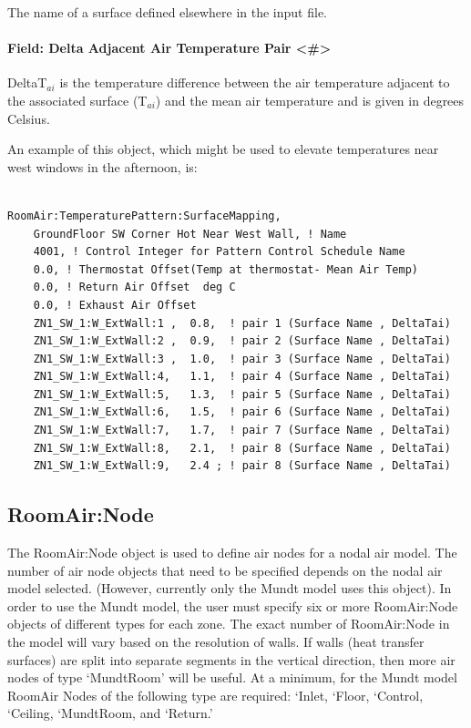 The name of a surface defined elsewhere in the input file.

\paragraph{Field: Delta Adjacent Air Temperature Pair \textless{}\#\textgreater{}}\label{field-delta-adjacent-air-temperature-pair}

DeltaT\(_{ai}\) is the temperature difference between the air temperature adjacent to the associated surface (T\(_{ai}\)) and the mean air temperature and is given in degrees Celsius.

An example of this object, which might be used to elevate temperatures near west windows in the afternoon, is:

\begin{lstlisting}

RoomAir:TemperaturePattern:SurfaceMapping,
    GroundFloor SW Corner Hot Near West Wall, ! Name
    4001, ! Control Integer for Pattern Control Schedule Name
    0.0, ! Thermostat Offset(Temp at thermostat- Mean Air Temp)
    0.0, ! Return Air Offset  deg C
    0.0, ! Exhaust Air Offset
    ZN1_SW_1:W_ExtWall:1 ,  0.8,  ! pair 1 (Surface Name , DeltaTai)
    ZN1_SW_1:W_ExtWall:2 ,  0.9,  ! pair 2 (Surface Name , DeltaTai)
    ZN1_SW_1:W_ExtWall:3 ,  1.0,  ! pair 3 (Surface Name , DeltaTai)
    ZN1_SW_1:W_ExtWall:4,   1.1,  ! pair 4 (Surface Name , DeltaTai)
    ZN1_SW_1:W_ExtWall:5,   1.3,  ! pair 5 (Surface Name , DeltaTai)
    ZN1_SW_1:W_ExtWall:6,   1.5,  ! pair 6 (Surface Name , DeltaTai)
    ZN1_SW_1:W_ExtWall:7,   1.7,  ! pair 7 (Surface Name , DeltaTai)
    ZN1_SW_1:W_ExtWall:8,   2.1,  ! pair 8 (Surface Name , DeltaTai)
    ZN1_SW_1:W_ExtWall:9,   2.4 ; ! pair 8 (Surface Name , DeltaTai)
\end{lstlisting}

\subsection{RoomAir:Node}\label{roomairnode}

The RoomAir:Node object is used to define air nodes for a nodal air model. The number of air node objects that need to be specified depends on the nodal air model selected. (However, currently only the Mundt model uses this object). In order to use the Mundt model, the user must specify six or more RoomAir:Node objects of different types for each zone. The exact number of RoomAir:Node in the model will vary based on the resolution of walls. If walls (heat transfer surfaces) are split into separate segments in the vertical direction, then more air nodes of type `MundtRoom' will be useful. At a minimum, for the Mundt model RoomAir Nodes of the following type are required: `Inlet, `Floor, `Control, `Ceiling, `MundtRoom, and `Return.'

